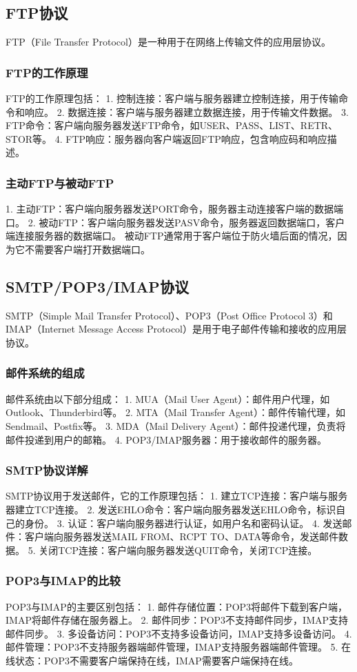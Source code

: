\documentclass{book}
\begin{document}
\subsection{FTP协议}
FTP（File Transfer Protocol）是一种用于在网络上传输文件的应用层协议。
\subsubsection{FTP的工作原理}
FTP的工作原理包括：
1. 控制连接：客户端与服务器建立控制连接，用于传输命令和响应。
2. 数据连接：客户端与服务器建立数据连接，用于传输文件数据。
3. FTP命令：客户端向服务器发送FTP命令，如USER、PASS、LIST、RETR、STOR等。
4. FTP响应：服务器向客户端返回FTP响应，包含响应码和响应描述。
\subsubsection{主动FTP与被动FTP}
1. 主动FTP：客户端向服务器发送PORT命令，服务器主动连接客户端的数据端口。
2. 被动FTP：客户端向服务器发送PASV命令，服务器返回数据端口，客户端连接服务器的数据端口。
被动FTP通常用于客户端位于防火墙后面的情况，因为它不需要客户端打开数据端口。
\subsection{SMTP/POP3/IMAP协议}
SMTP（Simple Mail Transfer Protocol）、POP3（Post Office Protocol 3）和IMAP（Internet Message Access Protocol）是用于电子邮件传输和接收的应用层协议。
\subsubsection{邮件系统的组成}
邮件系统由以下部分组成：
1. MUA（Mail User Agent）：邮件用户代理，如Outlook、Thunderbird等。
2. MTA（Mail Transfer Agent）：邮件传输代理，如Sendmail、Postfix等。
3. MDA（Mail Delivery Agent）：邮件投递代理，负责将邮件投递到用户的邮箱。
4. POP3/IMAP服务器：用于接收邮件的服务器。
\subsubsection{SMTP协议详解}
SMTP协议用于发送邮件，它的工作原理包括：
1. 建立TCP连接：客户端与服务器建立TCP连接。
2. 发送EHLO命令：客户端向服务器发送EHLO命令，标识自己的身份。
3. 认证：客户端向服务器进行认证，如用户名和密码认证。
4. 发送邮件：客户端向服务器发送MAIL FROM、RCPT TO、DATA等命令，发送邮件数据。
5. 关闭TCP连接：客户端向服务器发送QUIT命令，关闭TCP连接。
\subsubsection{POP3与IMAP的比较}
POP3与IMAP的主要区别包括：
1. 邮件存储位置：POP3将邮件下载到客户端，IMAP将邮件存储在服务器上。
2. 邮件同步：POP3不支持邮件同步，IMAP支持邮件同步。
3. 多设备访问：POP3不支持多设备访问，IMAP支持多设备访问。
4. 邮件管理：POP3不支持服务器端邮件管理，IMAP支持服务器端邮件管理。
5. 在线状态：POP3不需要客户端保持在线，IMAP需要客户端保持在线。
\end{document}
